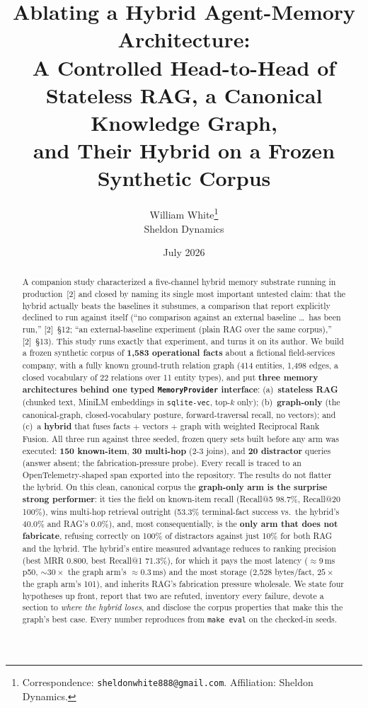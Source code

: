 \documentclass[11pt]{article}
\title{\vspace{-2em}\textbf{Ablating a Hybrid Agent-Memory Architecture:\\
A Controlled Head-to-Head of Stateless RAG, a Canonical Knowledge Graph,\\
and Their Hybrid on a Frozen Synthetic Corpus}}
\author{William White\thanks{Correspondence: \texttt{sheldonwhite888@gmail.com}.
Affiliation: Sheldon Dynamics.}\\
\small Sheldon Dynamics}
\date{July 2026}
\begin{document}
\maketitle
\thispagestyle{fancy}

\begin{abstract}
\noindent A companion study characterized a five-channel hybrid memory substrate running
in production~[2] and closed by naming its single most important untested claim: that the
hybrid actually beats the baselines it subsumes, a comparison that report explicitly
declined to run against itself (``no comparison against an external baseline \dots\ has
been run,'' [2]~\S12; ``an external-baseline experiment (plain RAG over the same
corpus),'' [2]~\S13). This study runs exactly that experiment, and turns it on its author.
We build a frozen synthetic corpus of \textbf{1{,}583 operational facts} about a fictional
field-services company, with a fully known ground-truth relation graph (414 entities,
1{,}498 edges, a closed vocabulary of 22 relations over 11 entity types), and put
\textbf{three memory architectures behind one typed \texttt{MemoryProvider} interface}:
(a)~\textbf{stateless RAG} (chunked text, MiniLM embeddings in \texttt{sqlite-vec}, top-$k$
only); (b)~\textbf{graph-only} (the canonical-graph, closed-vocabulary posture,
forward-traversal recall, no vectors); and (c)~a \textbf{hybrid} that fuses facts $+$
vectors $+$ graph with weighted Reciprocal Rank Fusion. All three run against three seeded,
frozen query sets built before any arm was executed: \textbf{150 known-item},
\textbf{30 multi-hop} (2-3 joins), and \textbf{20 distractor} queries (answer absent; the
fabrication-pressure probe). Every recall is traced to an OpenTelemetry-shaped span
exported into the repository. The results do not flatter the hybrid. On this clean,
canonical corpus the \textbf{graph-only arm is the surprise strong performer}: it ties the
field on known-item recall (Recall@5 98.7\%, Recall@20 100\%), wins multi-hop retrieval
outright (53.3\% terminal-fact success vs.\ the hybrid's 40.0\% and RAG's 0.0\%), and, most
consequentially, is the \textbf{only arm that does not fabricate}, refusing correctly on
100\% of distractors against just 10\% for both RAG and the hybrid. The hybrid's entire
measured advantage reduces to ranking precision (best MRR 0.800, best Recall@1 71.3\%), for
which it pays the most latency ($\approx$9\,ms p50, ${\sim}30\times$ the graph arm's
$\approx$0.3\,ms) and the most storage (2{,}528 bytes/fact, $25\times$ the graph arm's
101), and inherits RAG's fabrication pressure wholesale. We state four hypotheses up front,
report that two are refuted, inventory every failure, devote a section to \emph{where the
hybrid loses}, and disclose the corpus properties that make this the graph's best case.
Every number reproduces from \texttt{make eval} on the checked-in seeds.
\end{abstract}
\end{document}
